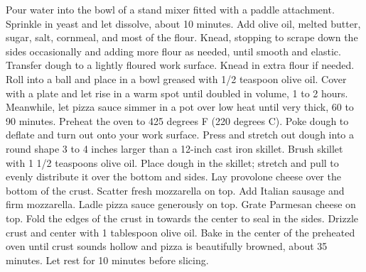 \begin{recipe}

\begin{recipemeta}
\end{recipemeta}

\begin{recipetext}
Pour water into the bowl of a stand mixer fitted with a paddle attachment. Sprinkle in yeast and let dissolve, about 10 minutes. Add olive oil, melted butter, sugar, salt, cornmeal, and most of the flour. Knead, stopping to scrape down the sides occasionally and adding more flour as needed, until smooth and elastic.
Transfer dough to a lightly floured work surface. Knead in extra flour if needed. Roll into a ball and place in a bowl greased with 1/2 teaspoon olive oil. Cover with a plate and let rise in a warm spot until doubled in volume, 1 to 2 hours.
Meanwhile, let pizza sauce simmer in a pot over low heat until very thick, 60 to 90 minutes.
Preheat the oven to 425 degrees F (220 degrees C).
Poke dough to deflate and turn out onto your work surface. Press and stretch out dough into a round shape 3 to 4 inches larger than a 12-inch cast iron skillet. Brush skillet with 1 1/2 teaspoons olive oil. Place dough in the skillet; stretch and pull to evenly distribute it over the bottom and sides.
Lay provolone cheese over the bottom of the crust. Scatter fresh mozzarella on top. Add Italian sausage and firm mozzarella. Ladle pizza sauce generously on top. Grate Parmesan cheese on top. Fold the edges of the crust in towards the center to seal in the sides. Drizzle crust and center with 1 tablespoon olive oil.
Bake in the center of the preheated oven until crust sounds hollow and pizza is beautifully browned, about 35 minutes. Let rest for 10 minutes before slicing.
\end{recipetext}

\end{recipe}
